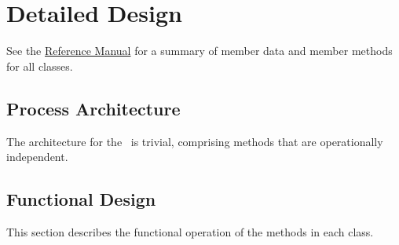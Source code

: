 
%
%
% 
%

\section{Detailed Design}
See the \href{file:refman.pdf}{Reference Manual}\cite{derivedstatebib:ReferenceManual} for a summary of member data and member methods for all classes.  

\subsection{Process Architecture}
The architecture for the \PlanetaryDesc\ is trivial, comprising methods that are operationally independent.

\subsection{Functional Design}
This section describes the functional operation of the methods in each class.

